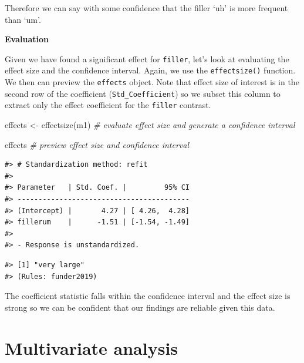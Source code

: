 \documentclass[
  letterpaper,
]{latex/krantz}
\newenvironment{Shaded}{\begin{snugshade}}{\end{snugshade}}
\newcommand{\CommentTok}[1]{\textcolor[rgb]{0.00,0.00,0.00}{\textit{#1}}}
\newcommand{\DecValTok}[1]{\textcolor[rgb]{0.00,0.00,0.00}{#1}}
\newcommand{\FunctionTok}[1]{\textcolor[rgb]{0.00,0.00,0.00}{#1}}
\newcommand{\NormalTok}[1]{\textcolor[rgb]{0.00,0.00,0.00}{#1}}
\newcommand{\OtherTok}[1]{\textcolor[rgb]{0.00,0.00,0.00}{#1}}
\newcommand{\SpecialCharTok}[1]{\textcolor[rgb]{0.00,0.00,0.00}{#1}}
\begin{document}
Therefore we can say with some confidence that the filler `uh' is more
frequent than `um'.

\textbf{Evaluation}

Given we have found a significant effect for \texttt{filler}, let's look
at evaluating the effect size and the confidence interval. Again, we use
the \texttt{effectsize()} function. We then can preview the
\texttt{effects} object. Note that effect size of interest is in the
second row of the coefficient (\texttt{Std\_Coefficient}) so we subset
this column to extract only the effect coefficient for the
\texttt{filler} contrast.

\begin{Shaded}
\begin{Highlighting}[]
\NormalTok{effects }\OtherTok{\textless{}{-}} \FunctionTok{effectsize}\NormalTok{(m1) }\CommentTok{\# evaluate effect size and generate a confidence interval}

\NormalTok{effects }\CommentTok{\# preview effect size and confidence interval}
\end{Highlighting}
\end{Shaded}

\begin{verbatim}
#> # Standardization method: refit
#> 
#> Parameter   | Std. Coef. |         95% CI
#> -----------------------------------------
#> (Intercept) |       4.27 | [ 4.26,  4.28]
#> fillerum    |      -1.51 | [-1.54, -1.49]
#> 
#> - Response is unstandardized.
\end{verbatim}

\begin{Shaded}
\end{Shaded}

\begin{verbatim}
#> [1] "very large"
#> (Rules: funder2019)
\end{verbatim}

The coefficient statistic falls within the confidence interval and the
effect size is strong so we can be confident that our findings are
reliable given this data.

\hypertarget{multivariate-analysis}{%
\section{Multivariate analysis}\label{multivariate-analysis}}
\end{document}
